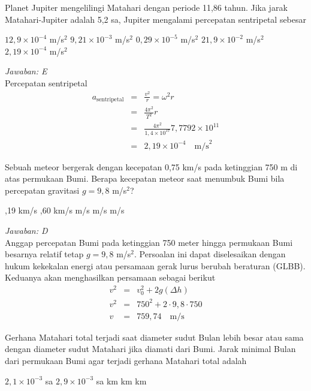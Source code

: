 \documentclass[11pt,fleqn, a4paper]{exam}
\begin{document}
\begin{questions}
\vspace{0.5cm}
\question Planet Jupiter mengelilingi Matahari dengan periode 11,86 tahun. Jika jarak Matahari-Jupiter adalah 5,2 sa, Jupiter mengalami percepatan sentripetal sebesar
\begin{choices}
\choice $12,9 \times 10^{-4}$ m/s$^2$
\choice $9,21 \times 10^{-3}$ m/s$^2$
\choice $0,29 \times 10^{-5}$ m/s$^2$
\choice $21,9 \times 10^{-2}$ m/s$^2$
\choice $2,19 \times 10^{-4}$ m/s$^2$
\end{choices}

\textit{Jawaban: E}\\
Percepatan sentripetal
\begin{eqnarray*}
a_{\text{sentripetal}} &=& \frac{v^2}{r} = \omega^2 r\\
&=& \frac{4 \pi^2}{T^2} r\\
&=& \frac{4 \pi^2}{1,4 \times 10^{17}} 7,7792 \times 10^{11}\\
&=& 2,19 \times 10^{-4} \quad \text{m/s}^2
\end{eqnarray*}


\vspace{0.5cm}
\question Sebuah meteor bergerak dengan kecepatan 0,75 km/s pada ketinggian 750 m di atas permukaan Bumi. Berapa kecepatan meteor saat menumbuk Bumi bila percepatan gravitasi $g = 9,8$ m/s$^2$?
\begin{choices}
,19 km/s
,60 km/s
 m/s
 m/s
 m/s
\end{choices}

\textit{Jawaban: D}\\
Anggap percepatan Bumi pada ketinggian 750 meter hingga permukaan Bumi besarnya relatif tetap $g = 9,8$ m/s$^2$. Persoalan ini dapat diselesaikan dengan hukum kekekalan energi atau persamaan gerak lurus berubah beraturan (GLBB). Keduanya akan menghasilkan persamaan sebagai berikut
\begin{eqnarray*}
v^2 &=& v_{0}^2 + 2 g (\Delta h)\\
v^2 &=& 750^2 + 2 \cdot 9,8 \cdot 750\\
v &=& 759,74 \quad \text{m/s}
\end{eqnarray*}


\vspace{0.5cm}
\question Gerhana Matahari total terjadi saat diameter sudut Bulan lebih besar atau sama dengan diameter sudut Matahari jika diamati dari Bumi. Jarak minimal Bulan dari permukaan Bumi agar terjadi gerhana Matahari total adalah
\begin{choices}
\choice $2,1 \times 10^{-3}$ sa
\choice $2,9 \times 10^{-3}$ sa
 km
 km
 km
\end{choices}


\end{questions}
\end{document}
